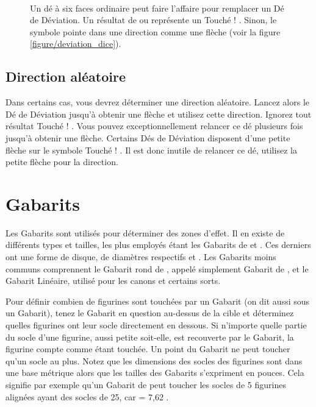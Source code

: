 \begin{figure}[!htbp]
\begin{minipage}{0.67\textwidth}
\vspace*{3ex}
\paragraph{}

Un dé à six faces ordinaire peut faire l'affaire pour remplacer un Dé de Déviation. Un résultat de  ou  représente un \og Touché ! \fg . Sinon, le symbole  pointe dans une direction comme une flèche (voir la figure \ref{figure/deviation_dice}).
\end{minipage}
\end{figure}

\subsection{Direction aléatoire}

Dans certains cas, vous devrez déterminer une direction aléatoire. Lancez alors le Dé de Déviation jusqu'à obtenir une flèche et utilisez cette direction. Ignorez tout résultat \og Touché ! \fg{}. Vous pouvez exceptionnellement relancer ce dé plusieurs fois jusqu'à obtenir une flèche. Certains Dés de Déviation disposent d'une petite flèche sur le symbole \og Touché ! \fg{}. Il est donc inutile de relancer ce dé, utilisez la petite flèche pour la direction.

\section{Gabarits}

Les Gabarits sont utilisés pour déterminer des zones d'effet. Il en existe de différents types et tailles, les plus employés étant les Gabarits de  et . Ces derniers ont une forme de disque, de diamètres respectifs  et . Les Gabarits moins communs comprennent le Gabarit rond de , appelé simplement Gabarit de , et le Gabarit Linéaire, utilisé pour les canons et certains sorts.

Pour définir combien de figurines sont touchées par un Gabarit (on dit aussi sous un Gabarit), tenez le Gabarit en question au-dessus de la cible et déterminez quelles figurines ont leur socle directement en dessous. Si n'importe quelle partie du socle d'une figurine, aussi petite soit-elle, est recouverte par le Gabarit, la figurine compte comme étant touchée. Un point du Gabarit ne peut toucher qu'un socle au plus. Notez que les dimensions des socles des figurines sont dans une base métrique alors que les tailles des Gabarits s'expriment en pouces. Cela signifie par exemple qu'un Gabarit de  peut toucher les socles de 5 figurines alignées ayant des socles de \unit{25}{\milli\meter}, car  = 7,62 {\centi\meter}.

